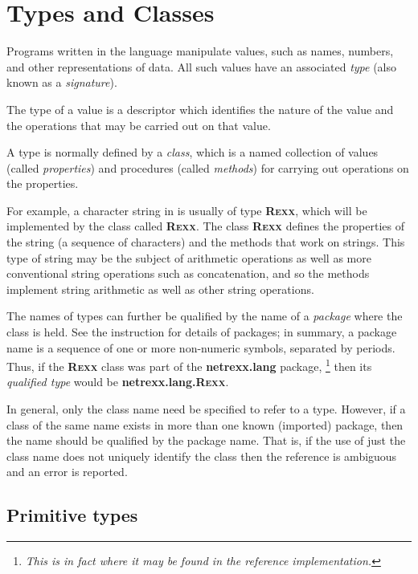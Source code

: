 \chapter{Types and Classes}\label{reftypes}
\index{,}
 
Programs written in the \nr{} language manipulate values, such as
names, numbers, and other representations of data.
All such values have an associated \emph{type} (also known as a
\emph{signature}).
 
The type of a value is a descriptor which identifies the nature of the
value and the operations that may be carried out on that value.
 
A type is normally defined by a \emph{class}, which is a named
collection of values (called \emph{properties}) and procedures (called
\emph{methods}) for carrying out operations on the properties.
 
For example, a character string in \nr{} is usually of
type \textbf{R\textsc{exx}}, which will be implemented by the class
called \textbf{R\textsc{exx}}.
The class \textbf{R\textsc{exx}} defines the properties of the string (a
sequence of characters) and the methods that work on strings.
This type of string may be the subject of arithmetic operations as well
as more conventional string operations such as concatenation, and so the
methods implement string arithmetic as well as other string operations.
 
The names of types can further be qualified by the name of a
\emph{package} where the class is held.  See the 
instruction for details of packages; in summary, a package name is a
sequence of one or more non-numeric symbols, separated by periods.
Thus, if the \textbf{R\textsc{exx}} class was part of
the \textbf{netrexx.lang} package,
\footnote{
\emph{This is in fact where it may be found in the reference
implementation.}
}
then its \emph{qualified type} would be \textbf{netrexx.lang.R\textsc{exx}}.
 
In general, only the class name need be specified to refer to a type.
However, if a class of the same name exists in more than one known
(imported) package, then the name should be qualified by the package
name.  That is, if the use of just the class name does not uniquely
identify the class then the reference is ambiguous and an error is
reported.
\section{Primitive types}\label{refprims}
 
